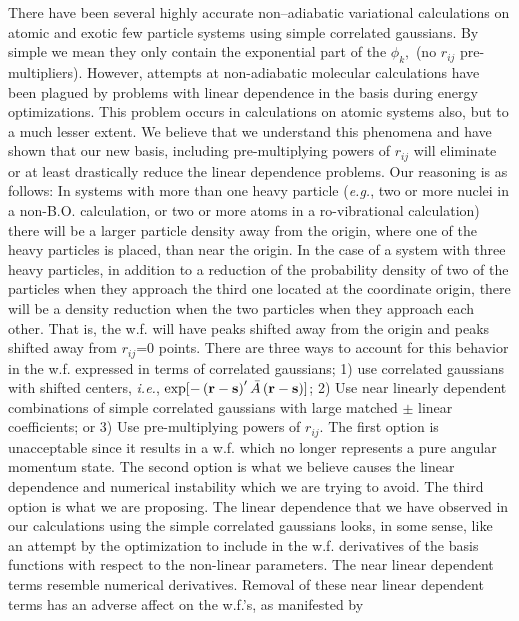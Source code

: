 There have been several highly accurate non--adiabatic variational
calculations on atomic and exotic few particle systems using simple
correlated gaussians\cite
{Kinghorn93,Kinghorn95b,A3,A37,Varga96}.
By simple we mean
they only contain the exponential part of the $\phi _k,$ (no $r_{ij}$
pre-multipliers). However, attempts at non-adiabatic molecular calculations
have been plagued by problems with linear dependence in the basis during
energy optimizations. This problem occurs in calculations on atomic systems
also, but to a much lesser extent. We believe that we understand this
phenomena and have shown\cite{kinghorn99a} that our new basis, 
including pre-multiplying powers of $r_{ij}$
will eliminate or at least drastically reduce the linear dependence
problems. Our reasoning is as follows: In systems with more than one heavy
particle ({\it e.g.}, two or more nuclei in a non-B.O. calculation,
or two or more atoms in a ro-vibrational calculation)
there will be a larger particle density away from the origin,
where one of the heavy particles is placed, than near the origin.
In the case of a system with three heavy particles, in addition
to a reduction of the probability density of two of the particles
when they approach the third one located at the coordinate origin,
there will be a density reduction when the two particles when 
they approach
each other.
That is, the w.f. will have peaks shifted
away from the origin and peaks shifted away from 
$r_{ij}$=0 points. There are three ways to account for this behavior in
the w.f. expressed in terms of 
correlated gaussians; 1) use correlated gaussians
with shifted centers, {\it i.e.}, 
$\exp [-\left( {\bf r-s}\right) ^{\prime }%
\bar{A}\left( {\bf r-s}\right) ]$; 2) Use near linearly dependent
combinations of simple correlated gaussians with large matched $\pm $ linear
coefficients; or 3) Use pre-multiplying powers of $r_{ij}$. The first option
is unacceptable since it results in a w.f. which no longer
represents a pure angular momentum state. The second option is what we
believe causes the linear dependence and numerical instability which we are
trying to avoid. The third option is what we are proposing. The linear
dependence that we have observed in our calculations using the simple
correlated gaussians looks, in some sense, like an attempt by the
optimization to include in the w.f. derivatives of the basis
functions with respect to the non-linear parameters. The near linear
dependent terms resemble numerical derivatives. Removal of these near linear
dependent terms has an adverse affect on the w.f.'s, as manifested by
